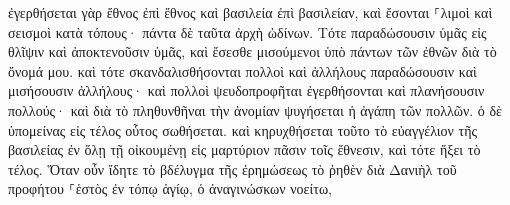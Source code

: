 \documentclass{openreader}
\begin{document}
ἐγερθήσεται γὰρ ἔθνος ἐπὶ ἔθνος καὶ βασιλεία ἐπὶ βασιλείαν, καὶ ἔσονται ⸀λιμοὶ καὶ σεισμοὶ κατὰ τόπους· 
πάντα δὲ ταῦτα ἀρχὴ ὠδίνων. 
Τότε παραδώσουσιν ὑμᾶς εἰς θλῖψιν καὶ ἀποκτενοῦσιν ὑμᾶς, καὶ ἔσεσθε μισούμενοι ὑπὸ πάντων τῶν ἐθνῶν διὰ τὸ ὄνομά μου. 
καὶ τότε σκανδαλισθήσονται πολλοὶ καὶ ἀλλήλους παραδώσουσιν καὶ μισήσουσιν ἀλλήλους· 
καὶ πολλοὶ ψευδοπροφῆται ἐγερθήσονται καὶ πλανήσουσιν πολλούς· 
καὶ διὰ τὸ πληθυνθῆναι τὴν ἀνομίαν ψυγήσεται ἡ ἀγάπη τῶν πολλῶν. 
ὁ δὲ ὑπομείνας εἰς τέλος οὗτος σωθήσεται. 
καὶ κηρυχθήσεται τοῦτο τὸ εὐαγγέλιον τῆς βασιλείας ἐν ὅλῃ τῇ οἰκουμένῃ εἰς μαρτύριον πᾶσιν τοῖς ἔθνεσιν, καὶ τότε ἥξει τὸ τέλος. 
Ὅταν οὖν ἴδητε τὸ βδέλυγμα τῆς ἐρημώσεως τὸ ῥηθὲν διὰ Δανιὴλ τοῦ προφήτου ⸀ἑστὸς ἐν τόπῳ ἁγίῳ, ὁ ἀναγινώσκων νοείτω, 
\end{document}
